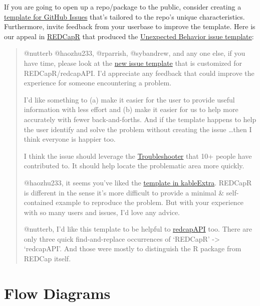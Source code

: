 \documentclass[
]{book}
\begin{document}
If you are going to open up a repo/package to the public, consider creating a \href{https://help.github.com/en/github/building-a-strong-community/about-issue-and-pull-request-templates}{template for GitHub Issues} that's tailored to the repo's unique characteristics. Furthermore, invite feedback from your userbase to improve the template. Here is our appeal in \href{https://github.com/OuhscBbmc/REDCapR/issues/291}{REDCapR} that produced the \href{https://github.com/OuhscBbmc/REDCapR/blob/master/.github/ISSUE_TEMPLATE/unexpected-behavior-issue-template.md}{Unexpected Behavior issue template}:

\begin{quote}
@nutterb @haozhu233, @rparrish, @sybandrew, and any one else, if you have time, please look at the \href{https://github.com/OuhscBbmc/REDCapR/blob/master/.github/ISSUE_TEMPLATE/unexpected-behavior-issue-template.md}{new issue template} that is customized for REDCapR/redcapAPI. I'd appreciate any feedback that could improve the experience for someone encountering a problem.

I'd like something to (a) make it easier for the user to provide useful information with less effort and (b) make it easier for us to help more accurately with fewer back-and-forths. And if the template happens to help the user identify and solve the problem without creating the issue \ldots then I think everyone is happier too.

I think the issue should leverage the \href{https://ouhscbbmc.github.io/REDCapR/articles/TroubleshootingApiCalls.html}{Troubleshooter} that 10+ people have contributed to. It should help locate the problematic area more quickly.

@haozhu233, it seems you've liked the \href{https://github.com/haozhu233/kableExtra/issues/new?template=bug_report.md}{template in kableExtra}. REDCapR is different in the sense it's more difficult to provide a minimal \& self-contained example to reproduce the problem. But with your experience with so many users and issues, I'd love any advice.

@nutterb, I'd like this template to be helpful to \href{https://github.com/nutterb/redcapAPI}{redcapAPI} too. There are only three quick find-and-replace occurrences of `REDCapR' -\textgreater{} `redcapAPI'. And those were mostly to distinguish the R package from REDCap itself.
\end{quote}

\hypertarget{flow-diagrams}{%
\section{Flow Diagrams}\label{flow-diagrams}}
\end{document}
